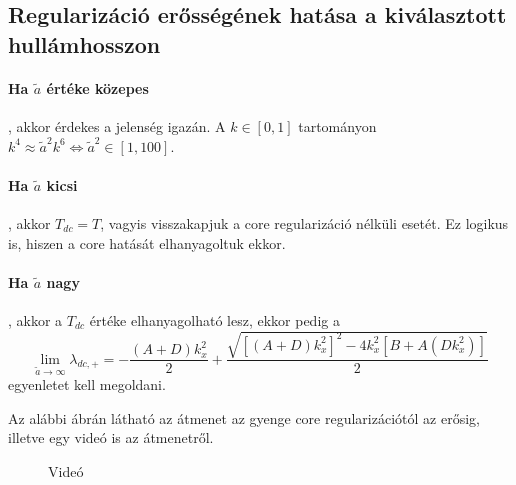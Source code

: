\documentclass[10pt,a4paper]{scrartcl}
\begin{document}
\subsection{Regularizáció erősségének hatása a kiválasztott hullámhosszon}
\paragraph{Ha $\tilde a$ értéke közepes}, akkor érdekes a jelenség igazán. A $k \in \left[ {0,1} \right]$ tartományon ${k^4} \approx {\tilde a^2}{k^6} \Leftrightarrow {\tilde a^2} \in \left[ {1,100} \right]$.

\paragraph{Ha $\tilde a$ kicsi}, akkor ${T_{dc}} = T$, vagyis visszakapjuk a core regularizáció nélküli esetét. Ez logikus is, hiszen a core hatását elhanyagoltuk ekkor. 

\paragraph{Ha $\tilde a$ nagy}, akkor a ${T_{dc}}$ értéke elhanyagolható lesz, ekkor pedig a
\[\mathop {\lim }\limits_{\tilde a \to \infty } {\lambda _{dc, + }} =  - \frac{{\left( {A + D} \right)k_x^2}}{2} + \frac{{\sqrt {{{\left[ {\left( {A + D} \right)k_x^2} \right]}^2} - 4k_x^2\left[ {B + A\left( {Dk_x^2} \right)} \right]} }}{2}\]
egyenletet kell megoldani.

Az alábbi ábrán látható az átmenet az gyenge core regularizációtól az erősig, illetve egy videó is az átmenetről.
\begin{figure}[h]
\centering
{}
\caption{Videó}
\end{figure}
\end{document}
